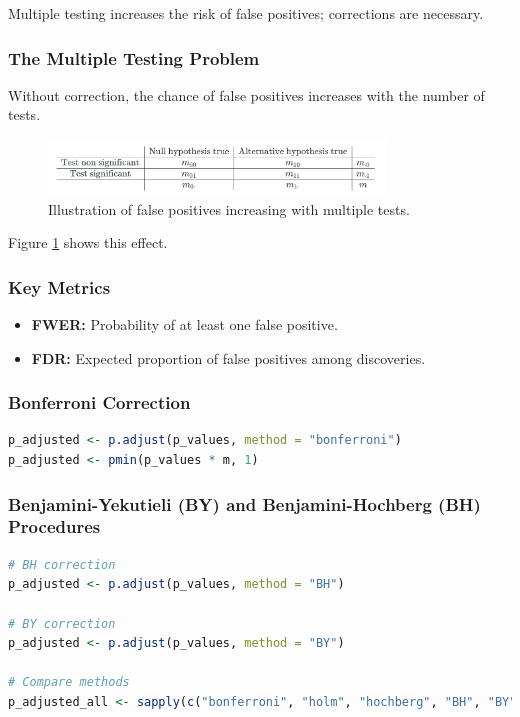 \documentclass[11pt,a4paper]{article}
\begin{document}
Multiple testing increases the risk of false positives; corrections are necessary.

\subsubsection{The Multiple Testing Problem}

Without correction, the chance of false positives increases with the number of tests.
\begin{figure}[htb]
    \centering
    \includegraphics[width=0.8\textwidth]{false-pos-example.png}
    \caption{Illustration of false positives increasing with multiple tests.}
    \label{fig:multiple-testing}
\end{figure}

Figure \ref{fig:multiple-testing} shows this effect.

\subsubsection{Key Metrics}
\begin{itemize}
  \item \textbf{FWER:} Probability of at least one false positive.
  \item \textbf{FDR:} Expected proportion of false positives among discoveries.
\end{itemize}

\subsubsection{Bonferroni Correction}
\begin{lstlisting}[language=R]
p_adjusted <- p.adjust(p_values, method = "bonferroni")
p_adjusted <- pmin(p_values * m, 1)
\end{lstlisting}

\subsubsection{Benjamini-Yekutieli (BY) and Benjamini-Hochberg (BH) Procedures}
\begin{lstlisting}[language=R]
# BH correction
p_adjusted <- p.adjust(p_values, method = "BH")

# BY correction
p_adjusted <- p.adjust(p_values, method = "BY")

# Compare methods
p_adjusted_all <- sapply(c("bonferroni", "holm", "hochberg", "BH", "BY"), function(method) p.adjust(p_values, method))
\end{lstlisting}
\end{document}
